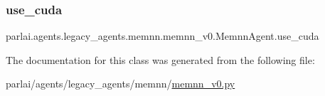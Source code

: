 \subsubsection{\texorpdfstring{use\+\_\+cuda}{use\_cuda}}
{\footnotesize\ttfamily parlai.\+agents.\+legacy\+\_\+agents.\+memnn.\+memnn\+\_\+v0.\+Memnn\+Agent.\+use\+\_\+cuda}



The documentation for this class was generated from the following file\+:\begin{DoxyCompactItemize}
\item 
parlai/agents/legacy\+\_\+agents/memnn/\hyperlink{memnn__v0_8py}{memnn\+\_\+v0.\+py}\end{DoxyCompactItemize}
